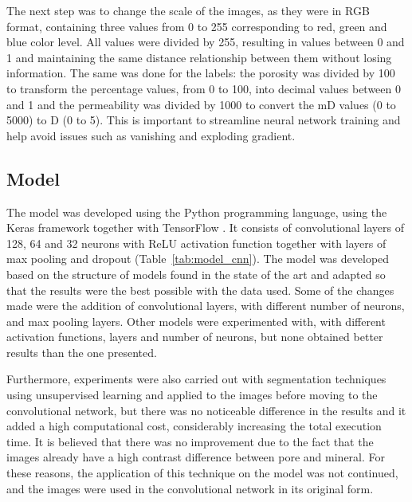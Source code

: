 \documentclass[a4paper,fleqn]{cas-sc}
\begin{document}
The next step was to change the scale of the images, as they were in RGB format, containing three values from 0 to 255 corresponding to red, green and blue color level. All values were divided by 255, resulting in values between 0 and 1 and maintaining the same distance relationship between them without losing information. The same was done for the labels: the porosity was divided by 100 to transform the percentage values, from 0 to 100, into decimal values between 0 and 1 and the permeability was divided by 1000 to convert the mD values (0 to 5000) to D (0 to 5). This is important to streamline neural network training and help avoid issues such as vanishing and exploding gradient.

\subsection{Model}
The model was developed using the Python programming language, using the Keras framework \cite{chollet2015keras} together with TensorFlow \cite{abadi2016tensorflow}. It consists of convolutional layers of 128, 64 and 32 neurons with ReLU activation function together with layers of max pooling and dropout (Table~\ref{tab:model_cnn}). The model was developed based on the structure of models found in the state of the art and adapted so that the results were the best possible with the data used. Some of the changes made were the addition of convolutional layers, with different number of neurons, and max pooling layers. Other models were experimented with, with different activation functions, layers and number of neurons, but none obtained better results than the one presented.

Furthermore, experiments were also carried out with segmentation techniques using unsupervised learning and applied to the images before moving to the convolutional network, but there was no noticeable difference in the results and it added a high computational cost, considerably increasing the total execution time. It is believed that there was no improvement due to the fact that the images already have a high contrast difference between pore and mineral. For these reasons, the application of this technique on the model was not continued, and the images were used in the convolutional network in its original form.
 
\end{document}
